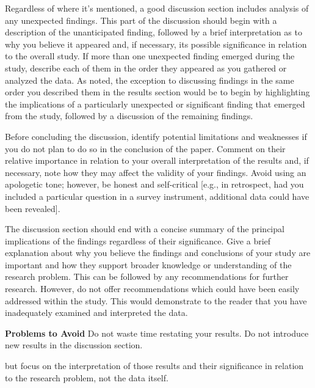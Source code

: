 Regardless of where it's mentioned, a good discussion section includes analysis of any unexpected findings. This part of the discussion should begin with a description of the unanticipated finding, followed by a brief interpretation as to why you believe it appeared and, if necessary, its possible significance in relation to the overall study. If more than one unexpected finding emerged during the study, describe each of them in the order they appeared as you gathered or analyzed the data. As noted, the exception to discussing findings in the same order you described them in the results section would be to begin by highlighting the implications of a particularly unexpected or significant finding that emerged from the study, followed by a discussion of the remaining findings.

Before concluding the discussion, identify potential limitations and weaknesses if you do not plan to do so in the conclusion of the paper. Comment on their relative importance in relation to your overall interpretation of the results and, if necessary, note how they may affect the validity of your findings. Avoid using an apologetic tone; however, be honest and self-critical [e.g., in retrospect, had you included a particular question in a survey instrument, additional data could have been revealed].

The discussion section should end with a concise summary of the principal implications of the findings regardless of their significance. Give a brief explanation about why you believe the findings and conclusions of your study are important and how they support broader knowledge or understanding of the research problem. This can be followed by any recommendations for further research. However, do not offer recommendations which could have been easily addressed within the study. This would demonstrate to the reader that you have inadequately examined and interpreted the data.



\textbf{Problems to Avoid}
Do not waste time restating your results. 
Do not introduce new results in the discussion section.

but focus on the interpretation of those results and their significance in relation to the research problem, not the data itself.




